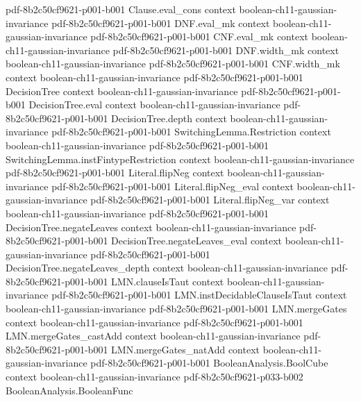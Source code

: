 \begin{theorem}
  {pdf-8b2c50cf9621-p001-b001}
\proofstep
  {Clause.eval_cons}
  {context}
  {boolean-ch11-gaussian-invariance}
  {pdf-8b2c50cf9621-p001-b001}
\proofstep
  {DNF.eval_mk}
  {context}
  {boolean-ch11-gaussian-invariance}
  {pdf-8b2c50cf9621-p001-b001}
\proofstep
  {CNF.eval_mk}
  {context}
  {boolean-ch11-gaussian-invariance}
  {pdf-8b2c50cf9621-p001-b001}
\proofstep
  {DNF.width_mk}
  {context}
  {boolean-ch11-gaussian-invariance}
  {pdf-8b2c50cf9621-p001-b001}
\proofstep
  {CNF.width_mk}
  {context}
  {boolean-ch11-gaussian-invariance}
  {pdf-8b2c50cf9621-p001-b001}
\proofstep
  {DecisionTree}
  {context}
  {boolean-ch11-gaussian-invariance}
  {pdf-8b2c50cf9621-p001-b001}
\proofstep
  {DecisionTree.eval}
  {context}
  {boolean-ch11-gaussian-invariance}
  {pdf-8b2c50cf9621-p001-b001}
\proofstep
  {DecisionTree.depth}
  {context}
  {boolean-ch11-gaussian-invariance}
  {pdf-8b2c50cf9621-p001-b001}
\proofstep
  {SwitchingLemma.Restriction}
  {context}
  {boolean-ch11-gaussian-invariance}
  {pdf-8b2c50cf9621-p001-b001}
\proofstep
  {SwitchingLemma.instFintypeRestriction}
  {context}
  {boolean-ch11-gaussian-invariance}
  {pdf-8b2c50cf9621-p001-b001}
\proofstep
  {Literal.flipNeg}
  {context}
  {boolean-ch11-gaussian-invariance}
  {pdf-8b2c50cf9621-p001-b001}
\proofstep
  {Literal.flipNeg_eval}
  {context}
  {boolean-ch11-gaussian-invariance}
  {pdf-8b2c50cf9621-p001-b001}
\proofstep
  {Literal.flipNeg_var}
  {context}
  {boolean-ch11-gaussian-invariance}
  {pdf-8b2c50cf9621-p001-b001}
\proofstep
  {DecisionTree.negateLeaves}
  {context}
  {boolean-ch11-gaussian-invariance}
  {pdf-8b2c50cf9621-p001-b001}
\proofstep
  {DecisionTree.negateLeaves_eval}
  {context}
  {boolean-ch11-gaussian-invariance}
  {pdf-8b2c50cf9621-p001-b001}
\proofstep
  {DecisionTree.negateLeaves_depth}
  {context}
  {boolean-ch11-gaussian-invariance}
  {pdf-8b2c50cf9621-p001-b001}
\proofstep
  {LMN.clauseIsTaut}
  {context}
  {boolean-ch11-gaussian-invariance}
  {pdf-8b2c50cf9621-p001-b001}
\proofstep
  {LMN.instDecidableClauseIsTaut}
  {context}
  {boolean-ch11-gaussian-invariance}
  {pdf-8b2c50cf9621-p001-b001}
\proofstep
  {LMN.mergeGates}
  {context}
  {boolean-ch11-gaussian-invariance}
  {pdf-8b2c50cf9621-p001-b001}
\proofstep
  {LMN.mergeGates_castAdd}
  {context}
  {boolean-ch11-gaussian-invariance}
  {pdf-8b2c50cf9621-p001-b001}
\proofstep
  {LMN.mergeGates_natAdd}
  {context}
  {boolean-ch11-gaussian-invariance}
  {pdf-8b2c50cf9621-p001-b001}
\proofstep
  {BooleanAnalysis.BoolCube}
  {context}
  {boolean-ch11-gaussian-invariance}
  {pdf-8b2c50cf9621-p033-b002}
\proofstep
  {BooleanAnalysis.BooleanFunc}

\end{theorem}
